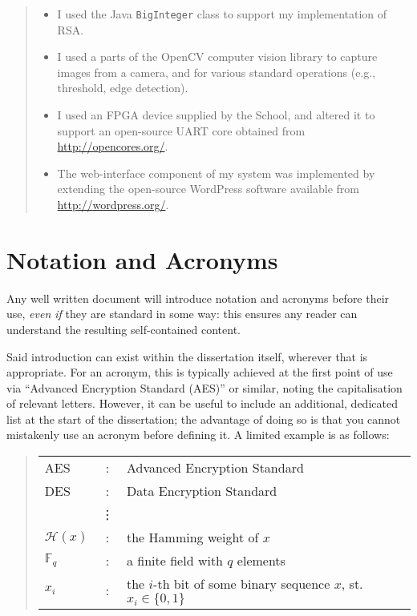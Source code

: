 \documentclass[ oneside,%
                    author={Michael Wray},
                    degree={BSc},
                     title={Some Structural Guidelines for CS Project Dissertations \\ With a Second Line Added to the Title},
                    unit={COMS30045},
                    subtitle={And Even A Fancy Subtitle}]{dissertation}
\begin{document}
\begin{quote}
\noindent
\begin{itemize}
\item I used the Java {\tt BigInteger} class to support my implementation 
      of RSA.
\item I used a parts of the OpenCV computer vision library to capture 
      images from a camera, and for various standard operations (e.g., 
      threshold, edge detection).
\item I used an FPGA device supplied by the School, and altered it 
      to support an open-source UART core obtained from 
      \url{http://opencores.org/}.
\item The web-interface component of my system was implemented by 
      extending the open-source WordPress software available from
      \url{http://wordpress.org/}.
\end{itemize}
\end{quote}


\chapter*{Notation and Acronyms}


\noindent
Any well written document will introduce notation and acronyms before
their use, {\em even if} they are standard in some way: this ensures 
any reader can understand the resulting self-contained content.  

Said introduction can exist within the dissertation itself, wherever 
that is appropriate.  For an acronym, this is typically achieved at 
the first point of use via ``Advanced Encryption Standard (AES)'' or 
similar, noting the capitalisation of relevant letters.  However, it 
can be useful to include an additional, dedicated list at the start 
of the dissertation; the advantage of doing so is that you cannot 
mistakenly use an acronym before defining it.  A limited example is 
as follows:

\begin{quote}
\noindent
\begin{tabular}{lcl}
AES                 &:     & Advanced Encryption Standard                                         \\
DES                 &:     & Data Encryption Standard                                             \\
                    &\vdots&                                                                      \\
${\mathcal H}( x )$ &:     & the Hamming weight of $x$                                            \\
${\mathbb  F}_q$    &:     & a finite field with $q$ elements                                     \\
$x_i$               &:     & the $i$-th bit of some binary sequence $x$, st. $x_i \in \{ 0, 1 \}$ \\
\end{tabular}
\end{quote}
\end{document}
